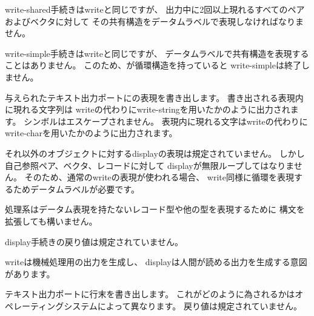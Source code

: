 \begin{entry}{%
}

{\cf write-shared}手続きは{\cf write}と同じですが、
出力中に2回以上現れるすべてのペアおよびベクタに対して
その共有構造をデータムラベルで表現しなければなりません。

\end{entry}

\begin{entry}{%
}

{\cf write-simple}手続きは{\cf write}と同じですが、
データムラベルで共有構造を表現することはありません。
このため、が循環構造を持っていると
{\cf write-simple}は終了しません。

\end{entry}


\begin{entry}{%
}

与えられたテキスト出力ポートにの表現を書き出します。
書き出される表現内に現れる文字列は
{\cf write}の代わりに{\cf write-string}を用いたかのように出力されます。
シンボルはエスケープされません。
表現内に現れる文字は{\cf write}の代わりに
{\cf write-char}を用いたかのように出力されます。

それ以外のオブジェクトに対する{\cf display}の表現は規定されていません。
しかし自己参照ペア、ベクタ、レコードに対して
{\cf display}が無限ループしてはなりません。
そのため、通常の{\cf write}の表現が使われる場合、
{\cf write}同様に循環を表現するためデータムラベルが必要です。

処理系はデータム表現を持たないレコード型や他の型を表現するために
構文を拡張しても構いません。

{\cf display}手続きの戻り値は規定されていません。

\begin{rationale}
{\cf write}は機械処理用の出力を生成し、
{\cf display}は人間が読める出力を生成する意図があります。
\end{rationale}
\end{entry}


\begin{entry}{%
}

テキスト出力ポートに行末を書き出します。
これがどのように為されるかはオペレーティングシステムによって異なります。
戻り値は規定されていません。

\end{entry}


